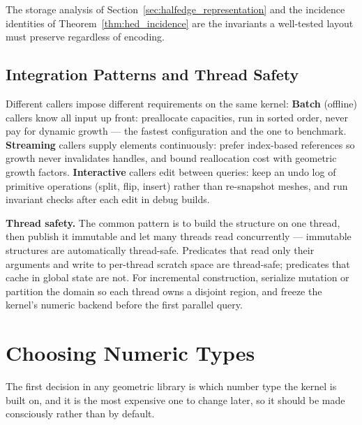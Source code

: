 The storage analysis of Section~\ref{sec:halfedge_representation} and the
incidence identities of Theorem~\ref{thm:hed_incidence} are the invariants
a well-tested layout must preserve regardless of encoding.
\subsection{Integration Patterns and Thread Safety}
\label{sec:appimpl_integration}
Different callers impose different requirements on the same kernel:
\textbf{Batch} (offline) callers know all input up
front: preallocate capacities, run in sorted order, never pay for dynamic
growth --- the fastest configuration and the one to benchmark.
\textbf{Streaming} callers supply elements continuously: prefer
index-based references so growth never invalidates handles, and bound
reallocation cost with geometric growth factors. \textbf{Interactive}
callers edit between queries: keep an undo log of primitive operations
(split, flip, insert) rather than re-snapshot meshes, and run invariant
checks after each edit in debug builds.

\textbf{Thread safety.} The common pattern is to build the structure on one
thread, then publish it immutable and let many
threads read concurrently --- immutable structures are automatically
thread-safe. Predicates that read only their arguments and write to
per-thread scratch space are thread-safe; predicates that cache in global
state are not. For incremental construction, serialize mutation or
partition the domain so each thread owns a disjoint region, and freeze the
kernel's numeric backend before the first parallel query.
\section{Choosing Numeric Types}
\label{sec:app_impl_numeric_types}
The first decision in any geometric library is which number type the kernel
is built on, and it is the most expensive one to change later, so it should
be made consciously rather than by default.
